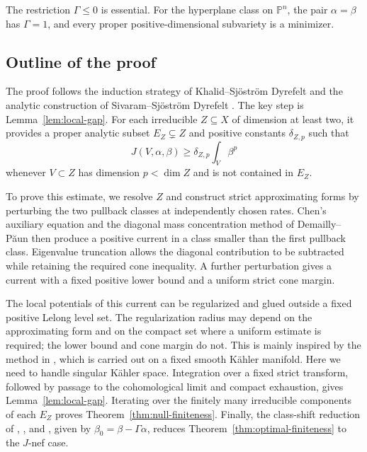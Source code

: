 \documentclass[reqno]{amsart}
\theoremstyle{remark}
\theoremstyle{plain}
\begin{document}
The restriction \(\Gamma\le0\) is essential. For the hyperplane class on \(\mathbb P^n\), the pair \(\alpha=\beta\) has \(\Gamma=1\), and every proper positive-dimensional subvariety is a minimizer.



\subsection{Outline of the proof}
The proof follows the induction strategy of Khalid--Sj\"ostr\"om Dyrefelt \cite[proofs of Theorems 3.1 and 3.9]{KSD26} and the analytic construction of Sivaram--Sj\"ostr\"om Dyrefelt \cite{SSD26}. 
The key step is Lemma~\ref{lem:local-gap}. For each irreducible \(Z\subseteq X\) of dimension at least two, it provides a proper analytic subset \(E_Z\subsetneq Z\) and positive constants \(\delta_{Z,p}\) such that
\[
J(V,\alpha,\beta)\ge\delta_{Z,p}\int_V\beta^p
\]
whenever \(V\subset Z\) has dimension \(p<\dim Z\) and is not contained in \(E_Z\). 

To prove this estimate, we resolve \(Z\) and construct strict approximating forms by perturbing the two pullback classes at independently chosen rates. Chen's auxiliary equation \cite[Theorem 1.14]{C21} and the diagonal mass concentration method of Demailly--P\u{a}un \cite{DP04} then produce a positive current in a class smaller than the first pullback class. Eigenvalue truncation allows the diagonal contribution to be subtracted while retaining the required cone inequality. A further perturbation gives a current with a fixed positive lower bound and a uniform strict cone margin.

The local potentials of this current can be regularized and glued outside a fixed positive Lelong level set. The regularization radius may depend on the approximating form and on the compact set where a uniform estimate is required; the lower bound and cone margin do not. This is mainly inspired by the method in \cite{SSD26}, which is carried out on a fixed smooth K\"ahler manifold. Here we need to handle singular K\"ahler space.  Integration over a fixed strict transform, followed by passage to the cohomological limit and compact exhaustion, gives Lemma~\ref{lem:local-gap}. Iterating over the finitely many irreducible components of each \(E_Z\) proves Theorem~\ref{thm:null-finiteness}. Finally, the class-shift reduction of \cite[Lemma 14]{SD20}, \cite[proof of Theorem 3.10 and Remark 3.11]{KSD26}, and \cite[Section 2.2.1]{SSD26}, given by \(\beta_0=\beta-\Gamma\alpha\), reduces Theorem~\ref{thm:optimal-finiteness} to the \(J\)-nef case.
\end{document}
